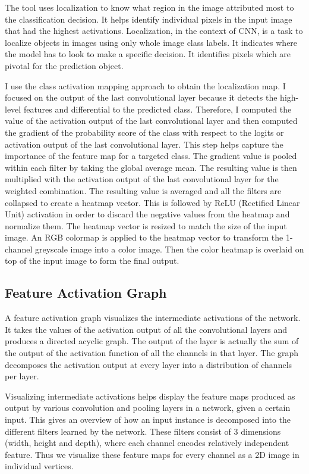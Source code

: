 The tool uses localization to know what region in the image attributed most to the classification decision. It helps identify individual pixels in the input image that had the highest activations. Localization, in the context of CNN, is a task to localize objects in images using only whole image class labels. It indicates where the model has to look to make a specific decision. It identifies pixels which are pivotal for the prediction object.

I use the class activation mapping approach to obtain the localization map. I focused on the output of the last convolutional layer because it detects the high-level features and differential to the predicted class. Therefore, I computed the value of the activation output of the last convolutional layer and then computed the gradient of the probability score of the class with respect to the logits or activation output of the last convolutional layer. This step helps capture the importance of the feature map for a targeted class. The gradient value is pooled within each filter by taking the global average mean. The resulting value is then multiplied with the activation output of the last convolutional layer for the weighted combination. The resulting value is averaged and all the filters are collapsed to create a heatmap vector. This is followed by ReLU (Rectified Linear Unit) activation in order to discard the negative values from the heatmap and normalize them. The heatmap vector is resized to match the size of the input image. An RGB colormap is applied to the heatmap vector to transform the 1-channel greyscale image into a color image. Then the color heatmap is overlaid on top of the input image to form the final output.

\subsection{Feature Activation Graph}

A feature activation graph visualizes the intermediate activations of the network. It takes the values of the activation output of all the convolutional layers and produces a directed acyclic graph. The output of the layer is actually the sum of the output of the activation function of all the channels in that layer. The graph decomposes the activation output at every layer into a distribution of channels per layer.

Visualizing intermediate activations helps display the feature maps produced as output by various convolution and pooling layers in a network, given a certain input. This gives an overview of how an input instance is decomposed into the different filters learned by the network. These filters consist of 3 dimensions (width, height and depth), where each channel encodes relatively independent feature. Thus we visualize these feature maps for every channel as a 2D image in individual vertices.

